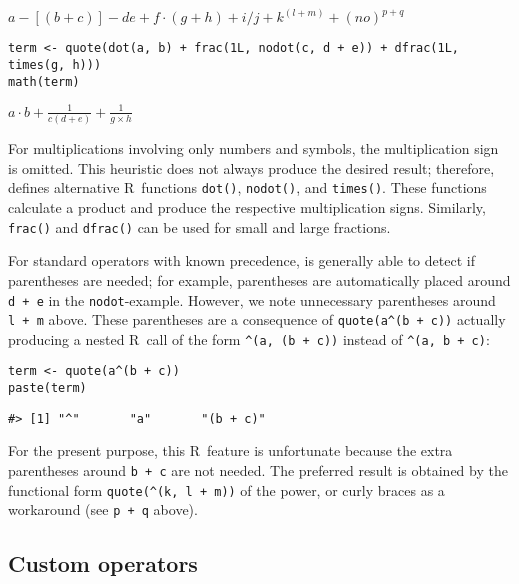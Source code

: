 \({{{{{{a}{-}{\left[\left({b}{+}{c}\right)\right]}}{-}{{d}{{}}{e}}}{+}{{f}{\cdot}{\left({g}{+}{h}\right)}}}{+}{{i}{/}{j}}}{+}{{k}^{\left({l}{+}{m}\right)}}}{+}{{\left({n}{{}}{o}\right)}^{{p}{+}{q}}}\)

\begin{verbatim}
term <- quote(dot(a, b) + frac(1L, nodot(c, d + e)) + dfrac(1L, times(g, h)))
math(term)
\end{verbatim}

\({{{a}{\cdot}{b}}{+}{\frac{1}{{c}{{}}{\left({d}{+}{e}\right)}}}}{+}{\displaystyle{\frac{1}{{g}{\times}{h}}}}\)

For multiplications involving only numbers and symbols, the multiplication sign
is omitted. This heuristic does not always produce the desired result;
therefore,  defines alternative R~functions \texttt{dot()}, \texttt{nodot()},
and \texttt{times()}. These functions calculate a product and produce the respective
multiplication signs. Similarly, \texttt{frac()} and \texttt{dfrac()} can be used for small
and large fractions.

For standard operators with known precedence,  is generally able to
detect if parentheses are needed; for example, parentheses are automatically
placed around \texttt{d\ +\ e} in the \texttt{nodot}-example. However, we note unnecessary
parentheses around \texttt{l\ +\ m} above. These parentheses are a consequence
of \texttt{quote(a\^{}(b\ +\ c))} actually producing a nested R~call of the
form \texttt{\textquotesingle{}\^{}\textquotesingle{}(a,\ (b\ +\ c))} instead of \texttt{\textquotesingle{}\^{}\textquotesingle{}(a,\ b\ +\ c)}:

\begin{verbatim}
term <- quote(a^(b + c))
paste(term)
\end{verbatim}

\begin{verbatim}
#> [1] "^"       "a"       "(b + c)"
\end{verbatim}

For the present purpose, this R~feature is unfortunate because the extra
parentheses around \texttt{b\ +\ c} are not needed. The preferred result is obtained by
the functional form \texttt{quote(\textquotesingle{}\^{}\textquotesingle{}(k,\ l\ +\ m))} of the power, or curly braces as a
workaround (see \texttt{p\ +\ q} above).

\hypertarget{custom-operators}{%
\subsection{Custom operators}\label{custom-operators}}

